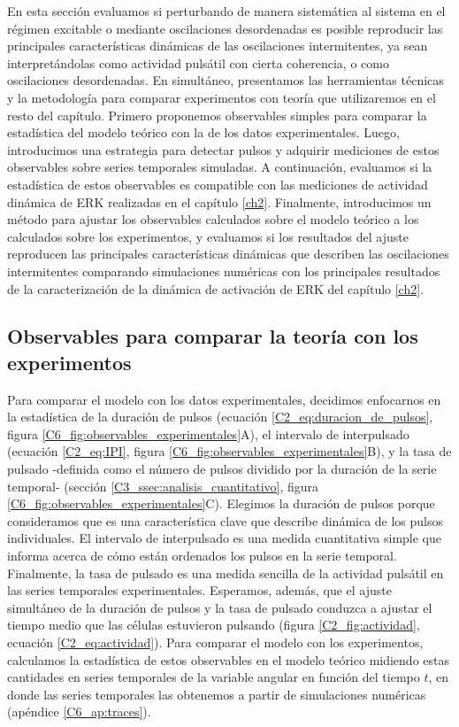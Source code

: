 \documentclass[./main.tex]{subfiles}
\begin{document}
En esta sección evaluamos si perturbando de manera sistemática al sistema en el régimen excitable o mediante oscilaciones desordenadas es posible reproducir las principales características dinámicas de las oscilaciones intermitentes, ya sean interpretándolas como actividad pulsátil con cierta coherencia, o como oscilaciones desordenadas. En simultáneo, presentamos las herramientas técnicas y la metodología para comparar experimentos con teoría que utilizaremos en el resto del capítulo. Primero proponemos observables simples para comparar la estadística del modelo teórico con la de los datos experimentales. Luego, introducimos una estrategia para detectar pulsos y adquirir mediciones de estos observables sobre series temporales simuladas. A continuación, evaluamos si la estadística de estos observables es compatible con las mediciones de actividad dinámica de ERK realizadas en el capítulo \ref{ch2}. Finalmente, introducimos un método para ajustar los observables calculados sobre el modelo teórico a los calculados sobre los experimentos, y evaluamos si los resultados del ajuste reproducen las principales características dinámicas que describen las oscilaciones intermitentes comparando simulaciones numéricas con los principales resultados de la caracterización de la dinámica de activación de ERK del capítulo \ref{ch2}. 



\subsection{Observables para comparar la teoría con los experimentos}

Para comparar el modelo con los datos experimentales, decidimos enfocarnos en la estadística de la duración de pulsos (ecuación \ref{C2_eq:duracion_de_pulsos}, figura \ref{C6_fig:observables_experimentales}A), el intervalo de interpulsado (ecuación \ref{C2_eq:IPI}, figura \ref{C6_fig:observables_experimentales}B), y la tasa de pulsado -definida como el número de pulsos dividido por la duración de la serie temporal- (sección \ref{C3_ssec:analisis_cuantitativo}, figura \ref{C6_fig:observables_experimentales}C). Elegimos la duración de pulsos porque consideramos que es una característica clave que describe dinámica de los pulsos individuales. El intervalo de interpulsado es una medida cuantitativa simple que informa acerca de cómo están ordenados los pulsos en la serie temporal. Finalmente, la tasa de pulsado es una medida sencilla de la actividad pulsátil en las series temporales experimentales. Esperamos, además, que el ajuste simultáneo de la duración de pulsos y la tasa de pulsado conduzca a ajustar el tiempo medio que las células estuvieron pulsando (figura \ref{C2_fig:actividad}, ecuación \ref{C2_eq:actividad}). Para comparar el modelo con los experimentos, calculamos la estadística de estos observables en el modelo teórico midiendo estas cantidades en series temporales de la variable angular \xx en función del tiempo $t$, en donde las series temporales las obtenemos a partir de simulaciones numéricas (apéndice \ref{C6_ap:traces}).
\end{document}
